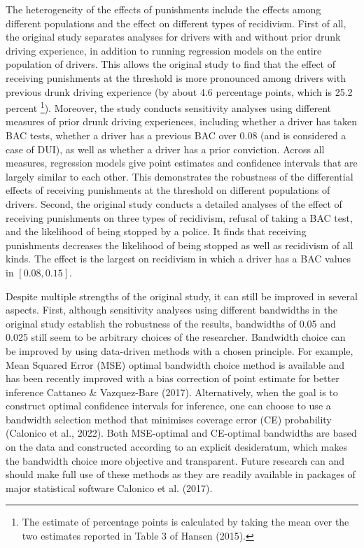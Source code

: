 \documentclass[
  11pt,
]{article}
\begin{document}
The heterogeneity of the effects of punishments include the effects
among different populations and the effect on different types of
recidivism. First of all, the original study separates analyses for
drivers with and without prior drunk driving experience, in addition to
running regression models on the entire population of drivers. This
allows the original study to find that the effect of receiving
punishments at the threshold is more pronounced among drivers with
previous drunk driving experience (by about 4.6 percentage points, which
is 25.2 percent
\footnote{The estimate of percentage points is calculated by taking the mean over the two estimates reported in Table 3 of Hansen (2015).}).
Moreover, the study conducts sensitivity analyses using different
measures of prior drunk driving experiences, including whether a driver
has taken BAC tests, whether a driver has a previous BAC over 0.08 (and
is considered a case of DUI), as well as whether a driver has a prior
conviction. Across all measures, regression models give point estimates
and confidence intervals that are largely similar to each other. This
demonstrates the robustness of the differential effects of receiving
punishments at the threshold on different populations of drivers.
Second, the original study conducts a detailed analyses of the effect of
receiving punishments on three types of recidivism, refusal of taking a
BAC test, and the likelihood of being stopped by a police. It finds that
receiving punishments decreases the likelihood of being stopped as well
as recidivism of all kinds. The effect is the largest on recidivism in
which a driver has a BAC values in \([0.08, 0.15]\).

Despite multiple strengths of the original study, it can still be
improved in several aspects. First, although sensitivity analyses using
different bandwidths in the original study establish the robustness of
the results, bandwidths of 0.05 and 0.025 still seem to be arbitrary
choices of the researcher. Bandwidth choice can be improved by using
data-driven methods with a chosen principle. For example, Mean Squared
Error (MSE) optimal bandwidth choice method is available and has been
recently improved with a bias correction of point estimate for better
inference Cattaneo \& Vazquez-Bare (2017). Alternatively, when the goal
is to construct optimal confidence intervals for inference, one can
choose to use a bandwidth selection method that minimises coverage error
(CE) probability (Calonico et al., 2022). Both MSE-optimal and
CE-optimal bandwidths are based on the data and constructed according to
an explicit desideratum, which makes the bandwidth choice more objective
and transparent. Future research can and should make full use of these
methods as they are readily available in packages of major statistical
software Calonico et al. (2017).
\end{document}
